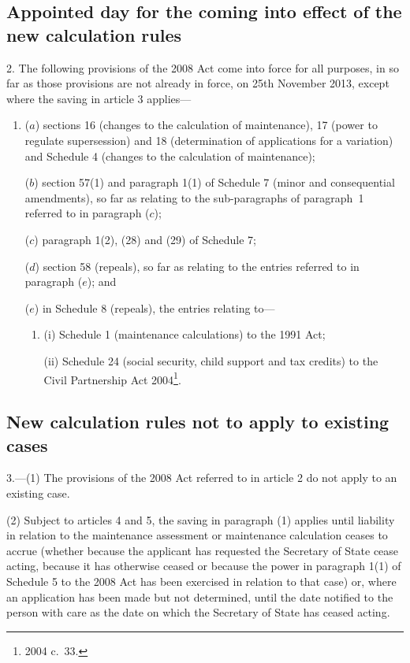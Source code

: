 \documentclass[12pt,a4paper]{article}
\begin{document}
\subsection[2. Appointed day for the coming into effect of the new calculation rules]{Appointed day for the coming into effect of the new calculation rules}

2.  The following provisions of the 2008 Act come into force for all purposes, in so far as those provisions are not already in force, on 25th November 2013, except where the saving in article 3 applies—
\begin{enumerate}\item[]
($a$) sections 16 (changes to the calculation of maintenance), 17 (power to regulate supersession) and 18 (determination of applications for a variation) and Schedule 4 (changes to the calculation of maintenance);

($b$) section 57(1) and paragraph 1(1) of Schedule 7 (minor and consequential amendments), so far as relating to the sub-paragraphs of paragraph~1 referred to in paragraph ($c$);

($c$) paragraph 1(2), (28) and (29) of Schedule 7;

($d$) section 58 (repeals), so far as relating to the entries referred to in paragraph ($e$); and

($e$) in Schedule 8 (repeals), the entries relating to—
\begin{enumerate}\item[]
(i) Schedule 1 (maintenance calculations) to the 1991 Act;

(ii) Schedule 24 (social security, child support and tax credits) to the Civil Partnership Act 2004\footnote{2004 c.~33.}.
\end{enumerate}
\end{enumerate}

\subsection[3. New calculation rules not to apply to existing cases]{New calculation rules not to apply to existing cases}

3.---(1)  The provisions of the 2008 Act referred to in article 2 do not apply to an existing case.

(2) Subject to articles 4 and 5, the saving in paragraph (1) applies until liability in relation to the maintenance assessment or maintenance calculation ceases to accrue (whether because the applicant has requested the Secretary of State cease acting, because it has otherwise ceased or because the power in paragraph 1(1) of Schedule 5 to the 2008 Act has been exercised in relation to that case) or, where an application has been made but not determined, until the date notified to the person with care as the date on which the Secretary of State has ceased acting.
\end{document}
